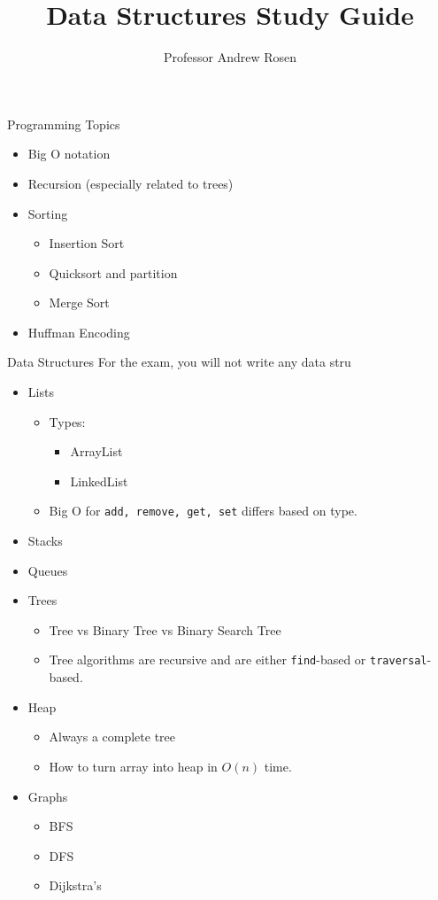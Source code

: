 \documentclass[]{article}
\title{Data Structures Study Guide}
\author{Professor Andrew Rosen}
\begin{document}
\maketitle

Programming Topics
\begin{itemize}
	\item Big O notation
	\item Recursion (especially related to trees)
	\item Sorting
	\begin{itemize}
		\item Insertion Sort
		\item Quicksort and partition
		\item Merge Sort
	\end{itemize}
	\item Huffman Encoding
\end{itemize}



Data Structures
For the exam, you will not write any data stru
\begin{itemize}
	\item Lists
	\begin{itemize}
		\item Types:
		\begin{itemize}
			\item ArrayList
			\item LinkedList
		\end{itemize}
		\item Big O for \texttt{add, remove, get, set} differs based on type.
	\end{itemize}
	\item Stacks
	\item Queues
	\item Trees
	\begin{itemize}
		\item Tree vs Binary Tree vs Binary Search Tree
		\item Tree algorithms are recursive and are either \texttt{find}-based or \texttt{traversal}-based.
	\end{itemize}
	\item Heap
	\begin{itemize}
		\item Always a complete tree
		\item How to turn array into heap in $ O(n) $ time.
	\end{itemize}
	\item Graphs
	\begin{itemize}
		\item BFS
		\item DFS
		\item Dijkstra's
	\end{itemize}
\end{itemize}
\end{document}

